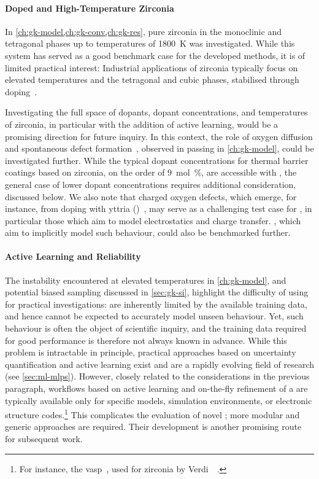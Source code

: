\paragraph{Doped and High-Temperature Zirconia}
In \cref{ch:gk-model,ch:gk-conv,ch:gk-res}, pure zirconia in the monoclinic and tetragonal phases up to temperatures of \qty{1800}{K} was investigated.
While this system has served as a good benchmark case for the developed methods, it is of limited practical interest: Industrial applications of zirconia typically focus on elevated temperatures and the tetragonal and cubic phases, stabilised through doping~\cite{ecl2008t,clws2014t}.

Investigating the full space of dopants, dopant concentrations, and temperatures of zirconia, in particular with the addition of active learning, would be a promising direction for future inquiry.
In this context, the role of oxygen diffusion and spontaneous defect formation~\cite{tw2023t}, observed in passing in \cref{ch:gk-model}, could be investigated further.
While the typical dopant concentrations for thermal barrier coatings based on zirconia, on the order of \qty{9}{mol\percent}, are accessible with \dft, the general case of lower dopant concentrations requires additional consideration, discussed below.
We also note that charged oxygen defects, which emerge, for instance, from doping with yttria ()~\cite{sd2011t,sbnp1999t,f2002t}, may serve as a challenging test case for \mlps, in particular those which aim to model electrostatics and charge transfer.
\glps, which aim to implicitly model such behaviour, could also be benchmarked further.


\paragraph{Active Learning and Reliability}
The instability encountered at elevated temperatures in \cref{ch:gk-model}, and potential biased sampling discussed in \cref{sec:gk-si}, highlight the difficulty of using \mlps for practical investigations: \mlps are inherently limited by the available training data, and hence cannot be expected to accurately model unseen behaviour.
Yet, such behaviour is often the object of scientific inquiry, and the training data required for good performance is therefore not always known in advance.
While this problem is intractable in principle, practical approaches based on uncertainty quantification and active learning exist and are a rapidly evolving field of research (see \cref{sec:ml-mlps}).
However, closely related to the considerations in the previous paragraph, workflows based on active learning and on-the-fly refinement of a \mlp are typically available only for specific models, \md simulation environments, or electronic structure codes.\footnote{For instance, the \gls{vasp}~\cite{jlkb2019q,jkk2019q}, used for zirconia by Verdi~\etal~\cite{vkjk2021q}.}
This complicates the evaluation of novel \mlps; more modular and generic approaches are required. Their development is another promising route for subsequent work.

